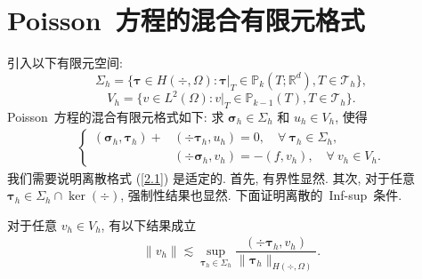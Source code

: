 \section{Poisson~方程的混合有限元格式}
引入以下有限元空间:
$$\Sigma_h=\{\boldsymbol\tau\in H(\div,\Omega): \boldsymbol\tau|_T\in\mathbb{P}_k(T;\mathbb{R}^d), T\in\mathcal{T}_h\},$$
$$V_h=\{v\in L^2(\Omega): v|_T\in\mathbb{P}_{k-1}(T), T\in\mathcal{T}_h\}.$$
Poisson~方程的混合有限元格式如下:
求 $\boldsymbol\sigma_h\in\Sigma_h$ 和 $u_h\in V_h$, 使得
\begin{align}
\label{2.1}
\left\{
\begin{array}{ll}
(\boldsymbol\sigma_h, \boldsymbol\tau_h)+&(\div\boldsymbol\tau_h, u_h) = 0, \quad \forall \ \boldsymbol\tau_h\in\Sigma_h, \\
&(\div\boldsymbol\sigma_h, v_h) = -(f, v_h), \quad \forall \ v_h\in V_h.
\end{array}
\right.
\end{align}
我们需要说明离散格式 (\ref{2.1}) 是适定的. 首先, 有界性显然. 其次, 对于任意 $\boldsymbol\tau_h\in\Sigma_h\cap\ker(\div)$, 强制性结果也显然. 下面证明离散的~Inf-sup~条件.
\begin{lemma}
对于任意 $v_h\in V_h$, 有以下结果成立
\begin{align}
\label{2.2}
\|v_h\|\lesssim\sup_{\boldsymbol\tau_h\in \Sigma_h}\dfrac{(\div\boldsymbol\tau_h, v_h)}{\|\boldsymbol\tau_h\|_{H(\div, \Omega)}}.
\end{align}
\end{lemma}
